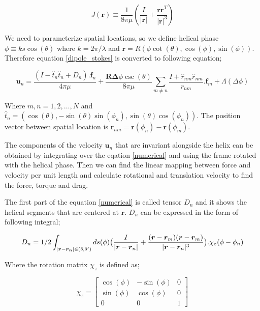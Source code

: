 \documentclass[12pt,a4paper,titlepage]{report}
\begin{document}
\begin{equation}
 J(\bm{r}) \equiv \frac{1}{8\pi \mu} (\frac{I}{|\bm{r}|} + \frac{\bm{rr}^T}{|\bm{r}|^3})
\label{Oseen}
\end{equation}

We need to parameterize spatial locations, so we define helical phase $\phi \equiv ks \cos(\theta)$ where 
$k = 2 \pi / \lambda$ and $\bm{r} = R(\phi \cot(\theta), \cos(\phi) , \sin(\phi))$. Therefore equation \ref{dipole_stokes}
is converted to following equation;




\begin{equation}
\bm{u}_n = \frac{(I- \hat{t}_n\hat{t}_n + D_n). \bm{f}_n}{4\pi \mu}
+ \frac{\bm{R}\bm{\Delta}\phi \csc (\theta)}{8 \pi \mu} \sum_{m \neq n}  \frac{I+\hat{r}_{nm} \hat{r}_{nm}}{r_{nm}}. \bm{f}_m
+ \Lambda (\Delta \phi)
\label{numerical}
\end{equation}




Where $m,n = 1,2, \dots ,N$ and $\hat{t}_n=(\cos(\theta), -\sin(\theta)\sin(\phi_n), \sin(\theta)\cos(\phi_n))$.
The position vector between spatial location is $\bm{r}_{nm} = \bm{r}(\phi_n)- \bm{r}(\phi_m)$.

The components of the velocity $\bm{u}_n$ that are invariant alongside the helix can be obtained by 
integrating over the eqation \ref{numerical} and using the frame rotated with the helical phase. Then we can
find the linear mapping between force and velocity per unit length and calculate rotational and translation velocity
to find the force, torque and drag.

The first part of the equation \ref{numerical} is called tensor $D_n$ and it shows the helical segments that
are centered at $\bm{r}$. $D_n$ can be expressed in the form of following integral;


\begin{equation}
D_n = 1/2 \int_{|\bm{r}-\bm{r_n}| \in (\delta, \delta \rq{})} ds(\phi) \big(\frac{I}{|\bm{r}-\bm{r}_n|} + \frac{(\bm{r} -\bm{r}_m)(\bm{r} -\bm{r}_m)}{|\bm{r}-\bm{r}_n|^3} \big). \chi_z(\phi-\phi_n)
\label{functionD}
\end{equation}


Where the rotation matrix $\chi_z$ is defined as;



\begin{equation}
  \chi_z = \begin{bmatrix}
       \cos(\phi)  &  -\sin(\phi) 		 & 0           \\[0.4em]
       \sin(\phi)		 & \cos(\phi)           & 0\\[0.4em]
       0           	& 0 		&  1
     \end{bmatrix}
\label{rotationOperator}
\end{equation}
\end{document}

